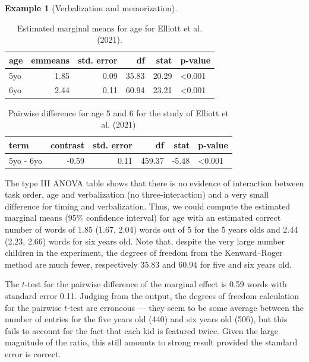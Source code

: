 \documentclass[
  11pt,
  letterpaper,
]{scrbook}
\theoremstyle{definition}
\newtheorem{example}{Example}[chapter]
\theoremstyle{definition}
\theoremstyle{remark}
\begin{document}
\begin{example}[Verbalization and
memorization]
\begin{longtable}[]{@{}lrrrrl@{}}

\caption{\label{tbl-Elliot-emmeans}Estimated marginal means for age for
Elliott et al. (2021).}

\tabularnewline

\toprule\noalign{}
age & emmeans & std. error & df & stat & p-value \\
\midrule\noalign{}
\endhead
\bottomrule\noalign{}
\endlastfoot
5yo & 1.85 & 0.09 & 35.83 & 20.29 & \textless0.001 \\
6yo & 2.44 & 0.11 & 60.94 & 23.21 & \textless0.001 \\

\end{longtable}

\begin{longtable}[]{@{}lrrrrl@{}}

\caption{\label{tbl-Elliot-pairdiff}Pairwise difference for age 5 and 6
for the study of Elliott et al. (2021)}

\tabularnewline

\toprule\noalign{}
term & contrast & std. error & df & stat & p-value \\
\midrule\noalign{}
\endhead
\bottomrule\noalign{}
\endlastfoot
5yo - 6yo & -0.59 & 0.11 & 459.37 & -5.48 & \textless0.001 \\

\end{longtable}

The type III ANOVA table shows that there is no evidence of interaction
between task order, age and verbalization (no three-interaction) and a
very small difference for timing and verbalization. Thus, we could
compute the estimated marginal means (95\% confidence interval) for age
with an estimated correct number of words of 1.85 (1.67, 2.04) words out
of 5 for the 5 years olds and 2.44 (2.23, 2.66) words for six years old.
Note that, despite the very large number children in the experiment, the
degrees of freedom from the Kenward--Roger method are much fewer,
respectively 35.83 and 60.94 for five and six years old.

The \(t\)-test for the pairwise difference of the marginal effect is
0.59 words with standard error 0.11. Judging from the output, the
degrees of freedom calculation for the pairwise \(t\)-test are erroneous
--- they seem to be some average between the number of entries for the
five years old (440) and six years old (506), but this fails to account
for the fact that each kid is featured twice. Given the large magnitude
of the ratio, this still amounts to strong result provided the standard
error is correct.


\end{example}
\end{document}
